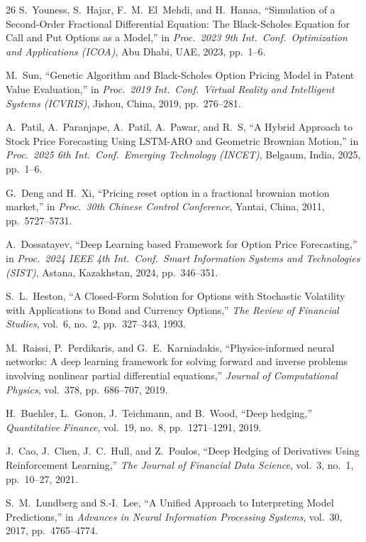 \documentclass[conference]{IEEEtran}
\begin{document}
\begin{thebibliography}{26}
 S.~Youness, S.~Hajar, F.~M.~El~Mehdi, and H.~Hanaa, ``Simulation of a Second-Order Fractional Differential Equation: The Black-Scholes Equation for Call and Put Options as a Model,'' in \textit{Proc.\ 2023 9th Int.\ Conf.\ Optimization and Applications (ICOA)}, Abu Dhabi, UAE, 2023, pp.~1--6.

 M.~Sun, ``Genetic Algorithm and Black-Scholes Option Pricing Model in Patent Value Evaluation,'' in \textit{Proc.\ 2019 Int.\ Conf.\ Virtual Reality and Intelligent Systems (ICVRIS)}, Jishou, China, 2019, pp.~276--281.

 A.~Patil, A.~Paranjape, A.~Patil, A.~Pawar, and R.~S, ``A Hybrid Approach to Stock Price Forecasting Using LSTM-ARO and Geometric Brownian Motion,'' in \textit{Proc.\ 2025 6th Int.\ Conf.\ Emerging Technology (INCET)}, Belgaum, India, 2025, pp.~1--6.

 G.~Deng and H.~Xi, ``Pricing reset option in a fractional brownian motion market,'' in \textit{Proc.\ 30th Chinese Control Conference}, Yantai, China, 2011, pp.~5727--5731.

 A.~Dossatayev, ``Deep Learning based Framework for Option Price Forecasting,'' in \textit{Proc.\ 2024 IEEE 4th Int.\ Conf.\ Smart Information Systems and Technologies (SIST)}, Astana, Kazakhstan, 2024, pp.~346--351.

 S.~L.~Heston, ``A Closed-Form Solution for Options with Stochastic Volatility with Applications to Bond and Currency Options,'' \textit{The Review of Financial Studies}, vol.~6, no.~2, pp.~327--343, 1993.

 M.~Raissi, P.~Perdikaris, and G.~E.~Karniadakis, ``Physics-informed neural networks: A deep learning framework for solving forward and inverse problems involving nonlinear partial differential equations,'' \textit{Journal of Computational Physics}, vol.~378, pp.~686--707, 2019.

 H.~Buehler, L.~Gonon, J.~Teichmann, and B.~Wood, ``Deep hedging,'' \textit{Quantitative Finance}, vol.~19, no.~8, pp.~1271--1291, 2019.

 J.~Cao, J.~Chen, J.~C.~Hull, and Z.~Poulos, ``Deep Hedging of Derivatives Using Reinforcement Learning,'' \textit{The Journal of Financial Data Science}, vol.~3, no.~1, pp.~10--27, 2021.

 S.~M.~Lundberg and S.-I.~Lee, ``A Unified Approach to Interpreting Model Predictions,'' in \textit{Advances in Neural Information Processing Systems}, vol.~30, 2017, pp.~4765--4774.


\end{thebibliography}
\end{document}
